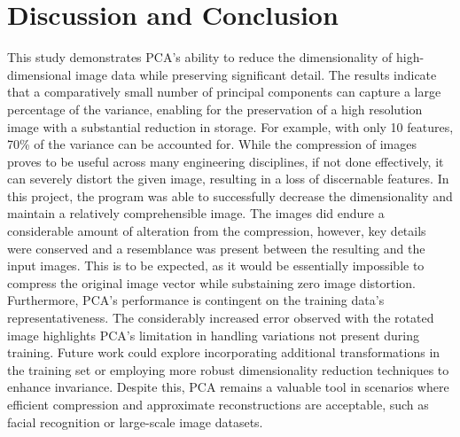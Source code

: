 \documentclass[conference]{IEEEtran}
\begin{document}
\section{Discussion and Conclusion}
This study demonstrates PCA's ability to reduce the dimensionality of high-dimensional image data while preserving significant detail. The results indicate that a comparatively small number of principal components can capture a large percentage of the variance, enabling for the preservation of a high resolution image with a substantial reduction in storage. For example, with only 10 features, 70\% of the variance can be accounted for. While the compression of images proves to be useful across many engineering disciplines, if not done effectively, it can severely distort the given image, resulting in a loss of discernable features. In this project, the program was able to successfully decrease the dimensionality and maintain a relatively comprehensible image. The images did endure a considerable amount of alteration from the compression, however, key details were conserved and a resemblance was present between the resulting and the input images. This is to be expected, as it would be essentially impossible to compress the original image vector while substaining zero image distortion. Furthermore, PCA's performance is contingent on the training data's representativeness. The considerably increased error observed with the rotated image highlights PCA's limitation in handling variations not present during training. Future work could explore incorporating additional transformations in the training set or employing more robust dimensionality reduction techniques to enhance invariance. Despite this, PCA remains a valuable tool in scenarios where efficient compression and approximate reconstructions are acceptable, such as facial recognition or large-scale image datasets.

%
%
%
%
%
\end{document}
